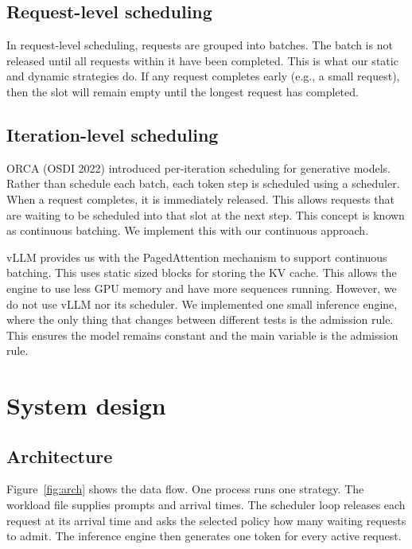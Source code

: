 \documentclass[12pt,a4paper]{article}
\begin{document}
\subsection{Request-level scheduling}
In request-level scheduling, requests are grouped into batches. The batch is not released until all requests within it have been completed. This is what our static and dynamic strategies do. If any request completes early (e.g., a small request), then the slot will remain empty until the longest request has completed.

\subsection{Iteration-level scheduling}
ORCA \cite{orca} (OSDI 2022) introduced per-iteration scheduling for generative models. Rather than schedule each batch, each token step is scheduled using a scheduler. When a request completes, it is immediately released. This allows requests that are waiting to be scheduled into that slot at the next step. This concept is known as continuous batching. We implement this with our continuous approach.

vLLM provides us with the PagedAttention mechanism \cite{vllm} to support continuous batching. This uses static sized blocks for storing the KV cache. This allows the engine to use less GPU memory and have more sequences running. However, we do not use vLLM nor its scheduler. We implemented one small inference engine, where the only thing that changes between different tests is the admission rule. This ensures the model remains constant and the main variable is the admission rule.

\section{System design}

\subsection{Architecture}
Figure~\ref{fig:arch} shows the data flow. One process runs one strategy. The workload file supplies prompts and arrival times. The scheduler loop releases each request at its arrival time and asks the selected policy how many waiting requests to admit. The inference engine then generates one token for every active request.
\end{document}
